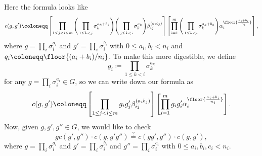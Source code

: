\documentclass{article}
\numberwithin{equation}{section}
\begin{document}
Here the formula looks like
\[c(g,g')\coloneqq\left[\prod_{1\le j<i\le m}\Bigg(\prod_{1\le k<j}\sigma_k^{a_k+b_k}\Bigg)\Bigg(\prod_{j\le k<i}\sigma_k^{a_k}\Bigg)\beta_{ij}^{(a_ib_j)}\right]\left[\prod_{i=1}^m\Bigg(\prod_{1\le k<i}\sigma_k^{a_k+b_k}\Bigg)\alpha_i^{\floor{\frac{a_i+b_i}{n_i}}}\right],\]
where $g=\prod_i\sigma_i^{a_i}$ and $g'=\prod_i\sigma_i^{b_i}$ with $0\le a_i,b_i<n_i$ and $q_i\coloneqq\floor{(a_i+b_i)/n_i}$. To make this more digestible, we define
\[g_i\coloneqq\prod_{1\le k<i}\sigma_k^{a_k}\]
for any $g=\prod_i\sigma_i^{a_i}\in G$, so we can write down our formula as
\[c(g,g')\coloneqq\left[\prod_{1\le j<i\le m}g_ig'_j\beta_{ij}^{(a_ib_j)}\right]\left[\prod_{i=1}^mg_ig'_i\alpha_i^{\floor{\frac{a_i+b_i}{n_i}}}\right].\]
Now, given $g,g',g''\in G$, we would like to check
\[gc(g',g'')\cdot c(g,g'g'')\stackrel?=c(gg',g'')\cdot c(g,g'),\]
where $g=\prod_i\sigma_i^{a_i}$ and $g'=\prod_i\sigma_i^{b_i}$ and $g''=\prod_i\sigma_i^{c_i}$ with $0\le a_i,b_i,c_i<n_i$.
\end{document}
